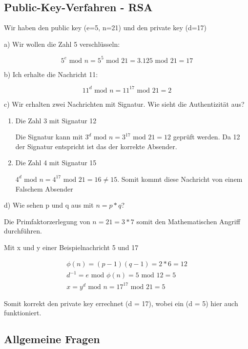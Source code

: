 \documentclass[a4paper]{article}
\begin{document}
\subsection{Public-Key-Verfahren - RSA}

Wir haben den public key (e=5, n=21) und den private key (d=17)

a) Wir wollen die Zahl 5 verschlüsseln:

\[
5^{e} \text{ mod } n = 5^5 \text{ mod } 21 = 3.125 \text{ mod } 21 = 17
\]

b) Ich erhalte die Nachricht 11:

\[
11^{d} \text{ mod } n = 11^{17} \text{ mod } 21 = 2
\]

c) Wir erhalten zwei Nachrichten mit Signatur. Wie sieht die Authentizität aus?

\begin{enumerate}
    \item Die Zahl 3 mit Signatur 12
    
    Die Signatur kann mit $3^{d} \text{ mod } n = 3^{17} \text{ mod } 21 = 12$ geprüft werden. Da 12 der Signatur entspricht ist das der korrekte Absender.
    \item Die Zahl 4 mit Signatur 15
    
    $4^{d} \text{ mod } n = 4^{17} \text{ mod } 21 = 16 \neq 15$. Somit kommt diese Nachricht von einem Falschem Absender 
\end{enumerate}

d) Wie sehen p und q aus mit $n = p * q$?

Die Primfaktorzerlegung von $n = 21 = 3 * 7$ somit den Mathematischen Angriff durchführen.

Mit x und y einer Beispielnachricht 5 und 17

\begin{align}
    \phi(n) = (p-1)(q-1) = 2*6 = 12\\
    d^{-1} = e \text{ mod } \phi(n) = 5 \text{ mod } 12 = 5\\
    x = y^d \text{ mod } n = 17^17 \text{ mod } 21 = 5
\end{align}

Somit korrekt den private key errechnet (d = 17), wobei ein (d = 5) hier auch funktioniert.

\subsection{Allgemeine Fragen}
\end{document}
